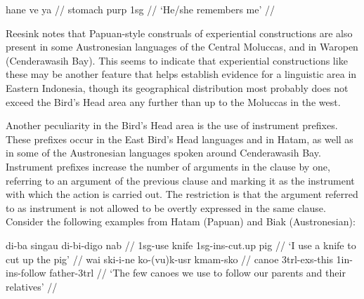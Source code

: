 \ex \label{}
\begingl
\gla hane ve ya // 
\glb stomach \acs{purp} \acs{1}\acs{sg} //
\glft `He/she remembers me' // 
\endgl
\xe

Reesink notes that Papuan-style construals of experiential constructions are also present in some Austronesian languages of the Central Moluccas, and in Waropen (Cenderawasih Bay). This seems to indicate that experiential constructions like these may be another feature that helps establish evidence for a linguistic area in Eastern Indonesia, though its geographical distribution most probably does not exceed the Bird's Head area any further than up to the Moluccas in the west.

Another peculiarity in the Bird's Head area is the use of instrument prefixes. These prefixes occur in the East Bird's Head languages and in Hatam, as well as in some of the Austronesian languages spoken around Cenderawasih Bay. Instrument prefixes increase the number of arguments in the clause by one, referring to an argument of the previous clause and marking it as the instrument with which the action is carried out. The restriction is that the argument referred to as instrument is not allowed to be overtly expressed in the same clause. Consider the following examples from Hatam (Papuan) and Biak (Austronesian):

\ex \label{Hatam_ins}
\begingl
\gla di-ba singau di-bi-digo nab // 
\glb \acs{1}\acs{sg}-use knife \acs{1}\acs{sg}-\acs{ins}-cut.up pig //
\glft `I use a knife to cut up the pig' // 
\endgl
\xe
\ex \label{Biak_ins}
\begingl
\gla wai ski-i-ne ko-(vu)k-usr kmam-sko // 
\glb canoe \acs{3}\acs{trl}-\acs{exs}-this \acs{1}\acs{in}-\acs{ins}-follow father-\acs{3}\acs{trl} //
\glft `The few canoes we use to follow our parents and their relatives' // 
\endgl
\xe

